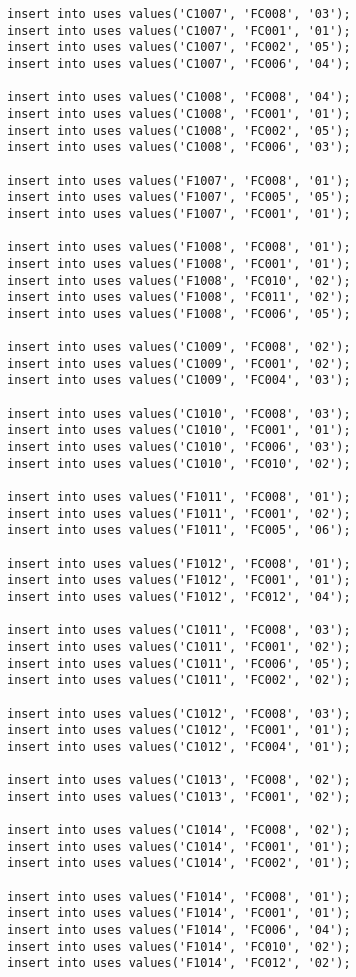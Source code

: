 \documentclass[a4,12pt]{report}
\begin{document}
\begin{lstlisting}
insert into uses values('C1007', 'FC008', '03');
insert into uses values('C1007', 'FC001', '01');
insert into uses values('C1007', 'FC002', '05');
insert into uses values('C1007', 'FC006', '04');

insert into uses values('C1008', 'FC008', '04');
insert into uses values('C1008', 'FC001', '01');
insert into uses values('C1008', 'FC002', '05');
insert into uses values('C1008', 'FC006', '03');

insert into uses values('F1007', 'FC008', '01');
insert into uses values('F1007', 'FC005', '05');
insert into uses values('F1007', 'FC001', '01');

insert into uses values('F1008', 'FC008', '01');
insert into uses values('F1008', 'FC001', '01');
insert into uses values('F1008', 'FC010', '02');
insert into uses values('F1008', 'FC011', '02');
insert into uses values('F1008', 'FC006', '05');

insert into uses values('C1009', 'FC008', '02');
insert into uses values('C1009', 'FC001', '02');
insert into uses values('C1009', 'FC004', '03');

insert into uses values('C1010', 'FC008', '03');
insert into uses values('C1010', 'FC001', '01');
insert into uses values('C1010', 'FC006', '03');
insert into uses values('C1010', 'FC010', '02');

insert into uses values('F1011', 'FC008', '01');
insert into uses values('F1011', 'FC001', '02');
insert into uses values('F1011', 'FC005', '06');

insert into uses values('F1012', 'FC008', '01');
insert into uses values('F1012', 'FC001', '01');
insert into uses values('F1012', 'FC012', '04');

insert into uses values('C1011', 'FC008', '03');
insert into uses values('C1011', 'FC001', '02');
insert into uses values('C1011', 'FC006', '05');
insert into uses values('C1011', 'FC002', '02');

insert into uses values('C1012', 'FC008', '03');
insert into uses values('C1012', 'FC001', '01');
insert into uses values('C1012', 'FC004', '01');

insert into uses values('C1013', 'FC008', '02');
insert into uses values('C1013', 'FC001', '02');

insert into uses values('C1014', 'FC008', '02');
insert into uses values('C1014', 'FC001', '01');
insert into uses values('C1014', 'FC002', '01');

insert into uses values('F1014', 'FC008', '01');
insert into uses values('F1014', 'FC001', '01');
insert into uses values('F1014', 'FC006', '04');
insert into uses values('F1014', 'FC010', '02');
insert into uses values('F1014', 'FC012', '02');


\end{lstlisting}
\end{document}
